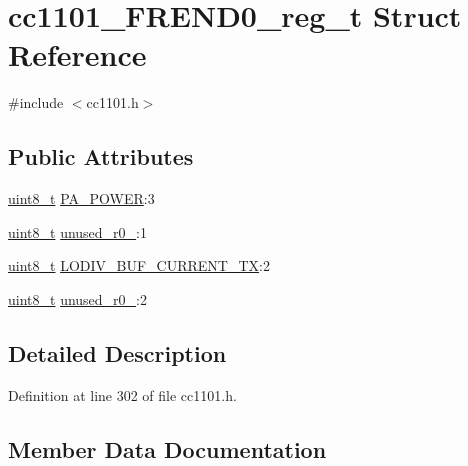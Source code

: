 \hypertarget{structcc1101___f_r_e_n_d0__reg__t}{}\section{cc1101\+\_\+\+F\+R\+E\+N\+D0\+\_\+reg\+\_\+t Struct Reference}
\label{structcc1101___f_r_e_n_d0__reg__t}


{\ttfamily \#include $<$cc1101.\+h$>$}

\subsection*{Public Attributes}
\begin{DoxyCompactItemize}
\item 
\hyperlink{_p_e___types_8h_aba7bc1797add20fe3efdf37ced1182c5}{uint8\+\_\+t} \hyperlink{structcc1101___f_r_e_n_d0__reg__t_a4a9f4e44be3b5f16b8b7e80ff2c4c6ac}{P\+A\+\_\+\+P\+O\+W\+ER}\+:3
\item 
\hyperlink{_p_e___types_8h_aba7bc1797add20fe3efdf37ced1182c5}{uint8\+\_\+t} \hyperlink{structcc1101___f_r_e_n_d0__reg__t_a7efc837d91f77c310407f31af5a59ac3}{unused\+\_\+r0\+\_}\+:1
\item 
\hyperlink{_p_e___types_8h_aba7bc1797add20fe3efdf37ced1182c5}{uint8\+\_\+t} \hyperlink{structcc1101___f_r_e_n_d0__reg__t_a6461f77120fbe314b6b185bc4e121732}{L\+O\+D\+I\+V\+\_\+\+B\+U\+F\+\_\+\+C\+U\+R\+R\+E\+N\+T\+\_\+\+TX}\+:2
\item 
\hyperlink{_p_e___types_8h_aba7bc1797add20fe3efdf37ced1182c5}{uint8\+\_\+t} \hyperlink{structcc1101___f_r_e_n_d0__reg__t_a743701e693d2aa4344c6f822f3932cd2}{unused\+\_\+r0\+\_}\+:2
\end{DoxyCompactItemize}


\subsection{Detailed Description}


Definition at line 302 of file cc1101.\+h.



\subsection{Member Data Documentation}
